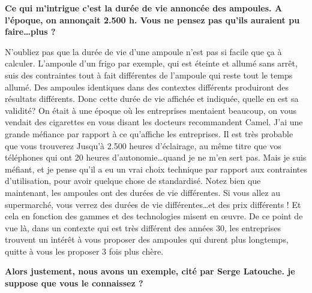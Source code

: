 \begin{small}


\textbf{Ce qui m'intrigue c'est la  durée de vie annoncée des ampoules. A l'époque, on annonçait 2.500 h. Vous ne pensez pas qu'ils auraient pu faire\dots plus ?
}\smallbreak

N'oubliez pas que la durée de vie d'une ampoule n'est pas si facile que ça à calculer. L'ampoule d'un frigo par exemple, qui est éteinte et allumé sans arrêt, suis des contraintes tout à fait différentes de l'ampoule qui reste tout le temps allumé.
Des ampoules identiques dans des contextes différents produiront des résultats différents. Donc cette durée de vie affichée et indiquée, quelle en est sa validité? On était à une époque où les entreprises mentaient beaucoup, on vous vendait des cigarettes en vous disant \og les docteurs recommandent Camel\fg{}. J'ai une grande méfiance par rapport à ce qu'affiche les entreprises. Il est très probable que vous trouverez \og Jusqu'à 2.500 heures d'éclairage\fg{}, au même titre que vos téléphones qui ont 20 heures d'autonomie\dots quand je ne m'en sert pas.
Mais je suis méfiant, et je pense qu'il a eu un vrai choix technique par rapport aux contraintes d'utilisation, pour avoir quelque chose de standardisé.
Notez bien que maintenant, les ampoules ont des durées de vie différentes. Si vous allez au supermarché, vous verrez des durées de vie différentes\dots et des prix différents ! Et cela en fonction des gammes et des technologies misent en œuvre.
De ce point de vue là, dans un contexte qui est très différent des années 30, les entreprises trouvent un intérêt à vous proposer des ampoules qui durent plus longtemps, quitte à vous les proposer 3 fois plus chère.

\textbf{Alors justement, nous avons un exemple, cité par Serge Latouche. je suppose que vous le connaissez ?}
\smallbreak



\end{small}
